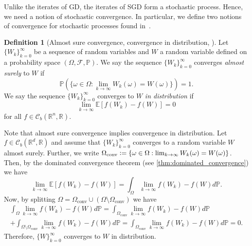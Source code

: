 \documentclass[12pt]{article}
\theoremstyle{definition}
\newtheorem{definition}[definition]{Definition}
\numberwithin{equation}{section}
\newcommand{\R}{\mathbb{R}}
\newcommand{\BP}{\mathbb{P}}
\newcommand{\CF}{\mathcal{F}}
\newcommand{\CC}{\mathcal{C}}
\newcommand{\ev}[1]{\mathbb{E}\left[{#1}\right]}
\newcommand{\defeq}{\vcentcolon=}
\begin{document}
Unlike the iterates of GD, the iterates of SGD form a stochastic process. Hence, we need a notion of stochastic convergence. In particular, we define two notions of convergence for stochastic processes found in~\autocite{eAppliedStochasticAnalysis2021}.

\begin{definition}[Almost sure convergence, convergence in distribution, ]
Let $\{W_k\}_{k=0}^{\infty}$ be a sequence of random variables and $W$ a random variable defined on a probability space $(\Omega, \CF, \BP)$. We say the sequence $\{W_k\}_{k=0}^{\infty}$ converges \emph{almost surely} to $W$ if
\begin{equation*}
  \BP(\{\omega \in \Omega : \lim_{k \rightarrow \infty}W_k(\omega) = W(\omega)\}) = 1.
\end{equation*}
We say the sequence  $\{W_k\}_{k=0}^{\infty}$ converges to $W$ \emph{in distribution} if
  \begin{equation*}
    \lim_{k \rightarrow \infty}\ev{f(W_k) - f(W)} = 0
  \end{equation*}
  for all $f \in \CC_b(\R^n, \R)$.
\end{definition}
Note that almost sure convergence implies convergence in distribution. Let $f \in \CC_b(\R^d, \R)$ and assume that $\{W_k\}_{k=0}^\infty$ converges to a random variable $W$ almost surely. Further, we write $\Omega_{\text{conv}} \defeq \{\omega \in \Omega : \lim_{k \rightarrow \infty}W_k(\omega) = W(\omega)\}$. Then, by the dominated convergence theorem (see \autoref{thm:dominated_convergence}) we have 
\begin{equation*}
  \lim_{k \rightarrow \infty} \ev{f(W_k) - f(W)} = \int_{\Omega} \lim_{k \rightarrow \infty} f(W_k) - f(W) d\BP.
\end{equation*}
Now, by splitting $\Omega = \Omega_{\text{conv}} \cup (\Omega \setminus \Omega_{\text{conv}})$ we have
\begin{multline*}
  \int_{\Omega} \lim_{k \rightarrow \infty} f(W_k) - f(W) d\BP 
  =\int_{\Omega_{\text{conv}}} \lim_{k \rightarrow \infty} f(W_k) - f(W) d\BP \\
   + \int_{\Omega \setminus \Omega_{\text{conv}}} \lim_{k \rightarrow \infty} f(W_k) - f(W) d\BP = \int_{\Omega_{\text{conv}}} \lim_{k \rightarrow \infty} f(W_k) - f(W) d\BP = 0.
\end{multline*}
Therefore, $\{W\}_{k=0}^\infty$ converges to $W$ in distribution.
\end{document}
